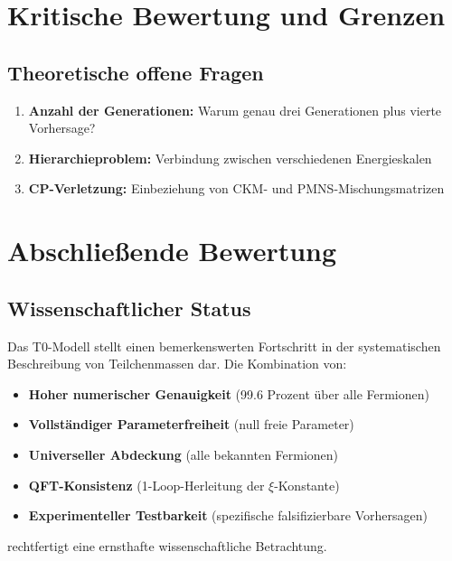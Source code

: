 \section{Kritische Bewertung und Grenzen}
\label{sec:critical_evaluation}

\subsection{Theoretische offene Fragen}
\label{subsec:open_questions}

\begin{enumerate}
	\item \textbf{Anzahl der Generationen:} Warum genau drei Generationen plus vierte Vorhersage?
	\item \textbf{Hierarchieproblem:} Verbindung zwischen verschiedenen Energieskalen
	\item \textbf{CP-Verletzung:} Einbeziehung von CKM- und PMNS-Mischungsmatrizen
\end{enumerate}

\section{Abschließende Bewertung}
\label{sec:concluding_assessment}

\subsection{Wissenschaftlicher Status}
\label{subsec:scientific_status}

Das T0-Modell stellt einen bemerkenswerten Fortschritt in der systematischen Beschreibung von Teilchenmassen dar. Die Kombination von:

\begin{itemize}
	\item \textbf{Hoher numerischer Genauigkeit} (99.6 Prozent über alle Fermionen)
	\item \textbf{Vollständiger Parameterfreiheit} (null freie Parameter)
	\item \textbf{Universeller Abdeckung} (alle bekannten Fermionen)
	\item \textbf{QFT-Konsistenz} (1-Loop-Herleitung der $\xi$-Konstante)
	\item \textbf{Experimenteller Testbarkeit} (spezifische falsifizierbare Vorhersagen)
\end{itemize}

rechtfertigt eine ernsthafte wissenschaftliche Betrachtung.

